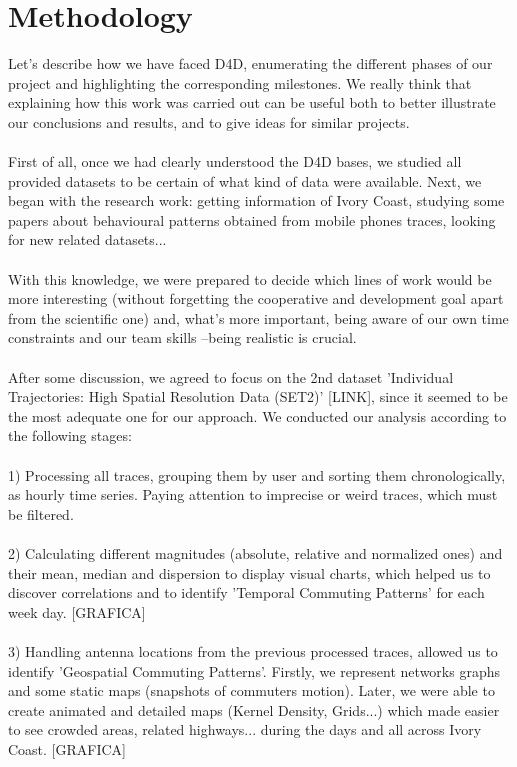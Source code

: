 \newpage

\section{Methodology}

Let's describe how we have faced D4D, enumerating the different phases of our project and highlighting the corresponding milestones. We really think that explaining how this work was carried out can be useful both to better illustrate our conclusions and results, and to give ideas for similar projects.
\\
\\
First of all, once we had clearly understood the D4D bases, we studied all provided datasets to be certain of what kind of data were available. Next, we began with the research work: getting information of Ivory Coast, studying some papers about behavioural patterns obtained from mobile phones traces, looking for new related datasets...
\\
\\
With this knowledge, we were prepared to decide which lines of work would be more interesting (without forgetting the cooperative and development goal apart from the scientific one) and, what's more important, being aware of our own time constraints and our team skills --being realistic is crucial.
\\
\\
After some discussion, we agreed to focus on the 2nd dataset 'Individual Trajectories: High Spatial Resolution Data (SET2)' [LINK], since it seemed to be the most adequate one for our approach. We conducted our analysis according to the following stages:
\\
\\
1) Processing all traces, grouping them by user and sorting them chronologically, as hourly time series. Paying attention to imprecise or weird traces, which must be filtered.
\\
\\
2) Calculating different magnitudes (absolute, relative and normalized ones) and their mean, median and dispersion to display visual charts, which helped us to discover correlations and to identify 'Temporal Commuting Patterns' for each week day. [GRAFICA]
\\
\\
3) Handling antenna locations from the previous processed traces, allowed us to identify 'Geospatial Commuting Patterns'. Firstly, we represent networks graphs and some static maps (snapshots of commuters motion). Later, we were able to create animated and detailed maps (Kernel Density, Grids...) which made easier to see crowded areas, related highways... during the days and all across Ivory Coast. [GRAFICA]
